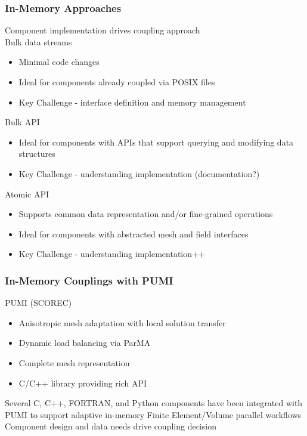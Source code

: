 \documentclass{beamer}
\begin{document}
\begin{frame}
  \frametitle{In-Memory Approaches}
  Component implementation drives coupling approach\\
  \smallskip
  Bulk data streams
  \begin{itemize}
    \item Minimal code changes
    \item Ideal for components already coupled via POSIX files
    \item Key Challenge - interface definition and memory management
  \end{itemize}
  Bulk API
  \begin{itemize}
    \item Ideal for components with APIs that support querying and modifying
      data structures
    \item Key Challenge - understanding implementation (documentation?)
  \end{itemize}
  Atomic API
  \begin{itemize}
    \item Supports common data representation and/or fine-grained operations
    \item Ideal for components with abstracted mesh and field interfaces
    \item Key Challenge - understanding implementation++
  \end{itemize}
\end{frame}

\begin{frame}
  \frametitle{In-Memory Couplings with PUMI}
  PUMI (SCOREC)
  \begin{itemize}
    \item Anisotropic mesh adaptation with local solution transfer
    \item Dynamic load balancing via ParMA
    \item Complete mesh representation
    \item C/C++ library providing rich API
  \end{itemize}
  \bigskip
  Several C, C++, FORTRAN, and Python components have been integrated with PUMI
  to support adaptive in-memory Finite Element/Volume parallel workflows\\
  \bigskip
  Component design and data needs drive coupling decision
\end{frame}
\end{document}
